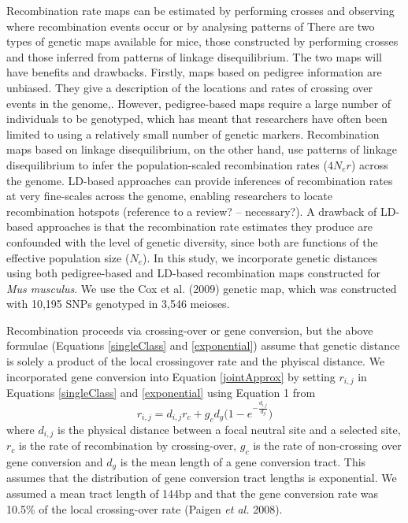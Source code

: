 \documentclass[11pt]{article}
\begin{document}
	Recombination rate maps can be estimated by performing crosses and observing where recombination events occur or by analysing patterns of  
	There are two types of genetic maps available for mice, those constructed by performing crosses and those inferred from patterns of linkage disequilibrium. The two maps will have benefits and drawbacks. Firstly, maps based on pedigree information are unbiased. They give a description of the locations and rates of crossing over events in the genome,. However, pedigree-based maps require a large number of individuals to be genotyped, which has meant that researchers have often been limited to using a relatively small number of genetic markers. Recombination maps based on linkage disequilibrium, on the other hand, use patterns of linkage disequilibrium to infer the population-scaled recombination rates ($4N_er$) across the genome. LD-based approaches can provide inferences of recombination rates at very fine-scales across the genome, enabling researchers to locate recombination hotspots (reference to a review? – necessary?). A drawback of LD-based approaches is that the recombination rate estimates they produce are confounded with the level of genetic diversity, since both are functions of the effective population size ($N_e$). In this study, we incorporate genetic distances using both pedigree-based and LD-based recombination maps constructed for \emph{Mus musculus}. We use the Cox et al. (2009) genetic map, which was constructed with 10,195 SNPs genotyped in 3,546 meioses. 

Recombination proceeds via crossing-over or gene conversion, but the above formulae (Equations \ref{singleClass} and \ref{exponential}) assume that genetic distance is solely a product of the local crossingover rate and the phyiscal distance.  We incorporated gene conversion into Equation \ref{jointApprox} by setting $r_{i,j}$ in Equations \ref{singleClass} and \ref{exponential} using Equation 1 from \cite{RN361}
		\begin{equation}
		\label{geneConversion}
		r_{i,j} = d_{i,j} r_c + g_c d_g \Bigg( 1 - e ^{-\frac{d_{i,j}}{d_g}} \Bigg)
		\end{equation}
	where $d_{i,j}$ is the physical distance between a focal neutral site and a selected site, $r_c$ is the rate of recombination by crossing-over, $g_c$ is the rate of non-crossing over gene conversion and $d_g$ is the mean length of a gene conversion tract. This assumes that the distribution of gene conversion tract lengths is exponential. We assumed a mean tract length of 144bp and that the gene conversion rate was 10.5\% of the local crossing-over rate (Paigen \textit{et al.} 2008).
\end{document}
